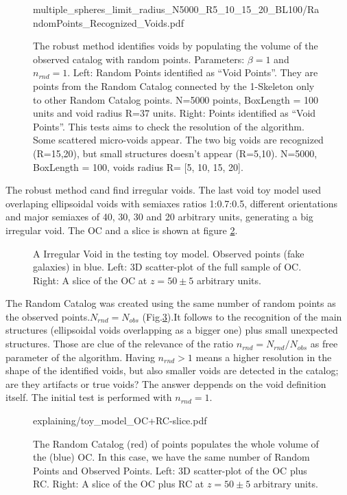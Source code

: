 \documentclass[preprint]{aastex62}
\begin{document}
\begin{figure}
          {multiple_spheres_limit_radius_N5000_R5_10_15_20_BL100/RandomPoints_Recognized_Voids.pdf}
  \caption{The robust method identifies voids by populating the volume of the
    observed catalog with random points. Parameters: $\beta=1$ and $n_{rnd}=1$.
    Left: Random Points identified as ``Void Points''. They are points
    from the Random Catalog
    connected by the 1-Skeleton only to other Random Catalog points. 
    N=5000 points, BoxLength = 100 units and void radius R=37 units.
    Right: Points identified as ``Void Points''. This tests aims to check
    the resolution of the algorithm. Some scattered micro-voids appear.
    The two big voids are recognized (R=15,20), but small structures doesn't
    appear (R=5,10).
    N=5000, BoxLength = 100, voids radius R= [5, 10, 15, 20].
    \label{fig:First void recognition}}
\end{figure}

The robust method cand find irregular voids.
The last void toy model used overlaping ellipsoidal voids with semiaxes
ratios 1:0.7:0.5, different orientations and major semiaxes of 40, 30,
30 and 20 arbitrary units, generating a big irregular void. The OC and a
slice is shown at figure \ref{fig:scatter_OC}.

\begin{figure}
  \caption{A Irregular Void in the testing toy model. Observed points
    (fake galaxies) in blue. Left: 3D scatter-plot
    of the full sample of OC.
    Right: A slice of the OC at $z=50\pm5$ arbitrary units.
    \label{fig:scatter_OC}}
\end{figure}

The Random Catalog was created using the same number of random points as
the observed points.$N_{rnd}=N_{obs}$ (Fig.\ref{fig:scatter_OC+RC}).It follows
to the recognition of the main structures (ellipsoidal voids overlapping as
a bigger one) plus small unexpected structures. Those are clue of the
relevance of the ratio $n_{rnd} = N_{rnd}/N_{obs}$ as free parameter of the
algorithm. Having $n_{rnd}>1$ means a higher resolution in the shape of the
identified voids, but also smaller voids are detected in the catalog; are
they artifacts or true voids? The answer deppends on the void definition itself.
The initial test is performed with $n_{rnd}=1$.

\begin{figure}
          {explaining/toy_model_OC+RC-slice.pdf}
          \caption{The Random Catalog (red) of points populates the whole volume
            of the (blue) OC. In this case, we have the same number of Random
            Points and Observed Points. Left: 3D scatter-plot of the OC plus
            RC. Right: A slice of the OC plus RC at $z=50\pm5$ arbitrary units.
            \label{fig:scatter_OC+RC}}
\end{figure}
\end{document}
